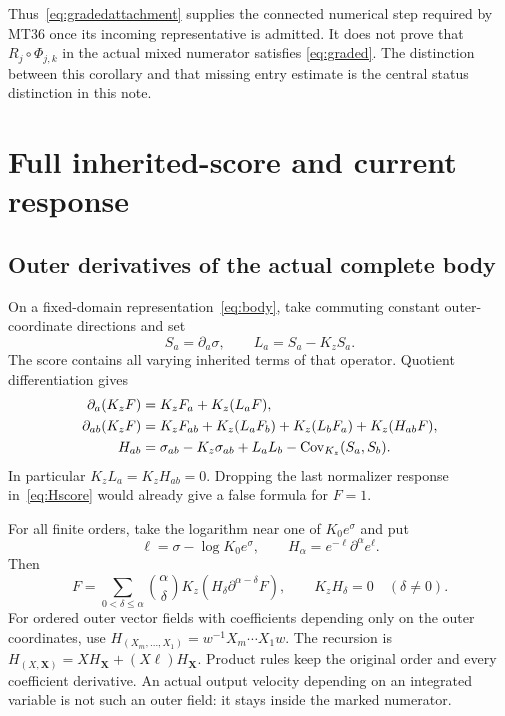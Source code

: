 \documentclass[11pt,letterpaper]{article}
\theoremstyle{plain}
\theoremstyle{remark}\newtheorem{remark}[theorem]{Scope}
\begin{document}
Thus~\eqref{eq:gradedattachment} supplies the connected numerical step
required by MT36 once its incoming representative is admitted. It does not
prove that $R_j\circ\Phi_{j,k}$ in the actual mixed numerator satisfies
\eqref{eq:graded}. The distinction between this corollary and that missing
entry estimate is the central status distinction in this note.

\section{Full inherited-score and current response}
\label{sec:score}

\subsection{Outer derivatives of the actual complete body}

On a fixed-domain representation~\eqref{eq:body}, take commuting constant
outer-coordinate directions and set
\begin{equation}
S_a=\partial_a\sigma,\qquad L_a=S_a-K_zS_a.
\end{equation}
The score contains all varying inherited terms of that operator. Quotient
differentiation gives
\begin{align}
\partial_a(K_zF)&=K_zF_a+K_z(L_aF),\label{eq:firstscore}\\
\partial_{ab}(K_zF)&=K_zF_{ab}+K_z(L_aF_b)+K_z(L_bF_a)
+K_z(H_{ab}F),\label{eq:secondscore}\\
H_{ab}&=\sigma_{ab}-K_z\sigma_{ab}+L_aL_b
-\operatorname{Cov}_{K_z}(S_a,S_b).
\label{eq:Hscore}
\end{align}
In particular $K_zL_a=K_zH_{ab}=0$. Dropping the last normalizer response
in~\eqref{eq:Hscore} would already give a false formula for $F=1$.

For all finite orders, take the logarithm near one of $K_0e^\sigma$ and put
\begin{equation}
\ell=\sigma-\log K_0e^\sigma,\qquad
H_\alpha=e^{-\ell}\partial^\alpha e^\ell.
\end{equation}
Then
\begin{equation}
[\partial^\alpha,K_z]F
=\sum_{0<\delta\le\alpha}\binom{\alpha}{\delta}
K_z(H_\delta\partial^{\alpha-\delta}F),
\qquad K_zH_\delta=0\quad(\delta\ne0).
\label{eq:bell}
\end{equation}
For ordered outer vector fields with coefficients depending only on the
outer coordinates, use $H_{(X_m,\ldots,X_1)}=w^{-1}X_m\cdots X_1w$.
The recursion is $H_{(X,\mathbf X)}=XH_{\mathbf X}+(X\ell)H_{\mathbf X}$.
Product rules keep the original order and every coefficient derivative.
An actual output velocity depending on an integrated variable is not such
an outer field: it stays inside the marked numerator.
\end{document}
